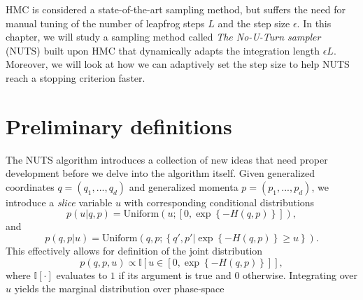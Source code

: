 HMC is considered a state-of-the-art sampling method, 
but suffers the need for manual tuning of the number of leapfrog steps $L$
and the step size $\epsilon$. In this chapter, we will study a sampling method called \textit{The No-U-Turn sampler} (NUTS) \cite{nuts} built upon
HMC that dynamically adapts the integration length $\epsilon L$. Moreover, we will look at how we can adaptively set the step size
to help NUTS reach a stopping criterion faster.


\section{Preliminary definitions}
The NUTS algorithm introduces a collection of new ideas that need proper development before we delve into the algorithm itself.
Given generalized coordinates $q = (q_1, ..., q_d)$ and generalized momenta $p = (p_1, ..., p_d)$, we introduce a \textit{slice} variable $u$
with corresponding conditional distributions
\begin{equation}
    p(u|q, p) = \text{Uniform}\left(u; \left[0, \exp\left\{-H(q, p)\right\}\right]\right),
\end{equation}
and
\begin{equation}
    p(q, p|u) = \text{Uniform}\left( q, p; \left\{q', p' \bigg| \exp\left\{-H(q, p)\right\} \geq u \right\} \right).
\end{equation}
This effectively allows for definition of the joint distribution
\begin{equation}
    p(q, p, u) \propto \mathbb{I}\left[u \in \left[0, \exp\left\{-H(q, p)\right\}\right]\right],
\end{equation}
where $\mathbb{I}[\cdot]$ evaluates to $1$ if its argument is true and $0$ otherwise. Integrating over $u$ yields the marginal distribution
over phase-space

